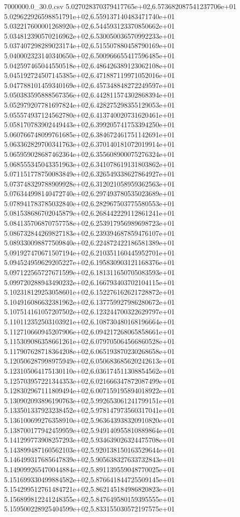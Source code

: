 \begin{filecontents*}{7000000.0_30.0.csv}
5.027028370379417765e+02,6.573682087541237706e+01
5.029622926598851791e+02,6.559137140483471740e+01
5.032217600001268920e+02,6.544593123370850662e+01
5.034812390570216962e+02,6.530050036570992233e+01
5.037407298289023174e+02,6.515507880458790169e+01
5.040002323140340650e+02,6.500966655417596485e+01
5.042597465044550518e+02,6.486426389123062108e+01
5.045192724507145385e+02,6.471887119971052016e+01
5.047788101459340169e+02,6.457348848272249597e+01
5.050383595888567356e+02,6.442811574302868394e+01
5.052979207781697824e+02,6.428275298355129053e+01
5.055574937124562780e+02,6.413740020731620461e+01
5.058170783902449443e+02,6.399205741753394250e+01
5.060766748099761685e+02,6.384672461751142691e+01
5.063362829700341763e+02,6.370140181072019914e+01
5.065959028687462364e+02,6.355608900075276324e+01
5.068555345043351963e+02,6.341078619131803862e+01
5.071151778750083849e+02,6.326549338627864927e+01
5.073748329788909928e+02,6.312021058959362563e+01
5.076344998140472740e+02,6.297493780535023689e+01
5.078941783785032840e+02,6.282967503775580553e+01
5.081538686702045879e+02,6.268442229112861241e+01
5.084135706870757758e+02,6.253917956989698723e+01
5.086732844269827183e+02,6.239394687859476107e+01
5.089330098877509840e+02,6.224872422186581389e+01
5.091927470671507194e+02,6.210351160445952701e+01
5.094524959629205227e+02,6.195830903121168376e+01
5.097122565727671599e+02,6.181311650705083593e+01
5.099720288943490232e+02,6.166793403702104115e+01
5.102318129253058601e+02,6.152276162621728872e+01
5.104916086632381962e+02,6.137759927986280672e+01
5.107514161057207502e+02,6.123244700322629797e+01
5.110112352503103921e+02,6.108730480168196664e+01
5.112710660945207906e+02,6.094217268065858661e+01
5.115309086358661261e+02,6.079705064566860528e+01
5.117907628718364208e+02,6.065193870230268658e+01
5.120506287998975949e+02,6.050683685620242613e+01
5.123105064175130110e+02,6.036174511308854562e+01
5.125703957221344353e+02,6.021666347872087499e+01
5.128302967111809494e+02,6.007159195894018922e+01
5.130902093896190763e+02,5.992653061241799151e+01
5.133501337923238452e+02,5.978147973560317041e+01
5.136100699276358910e+02,5.963643938320910820e+01
5.138700177942459959e+02,5.949140955810889864e+01
5.141299773908257293e+02,5.934639026324475708e+01
5.143899487160562103e+02,5.920138150163529644e+01
5.146499317685647839e+02,5.905638327633732843e+01
5.149099265470044884e+02,5.891139559048770025e+01
5.151699330499884582e+02,5.876641844725509145e+01
5.154299512761484721e+02,5.862145184986820823e+01
5.156899812241248355e+02,5.847649580159395555e+01
5.159500228925404599e+02,5.833155030572197575e+01

\end{filecontents*}

